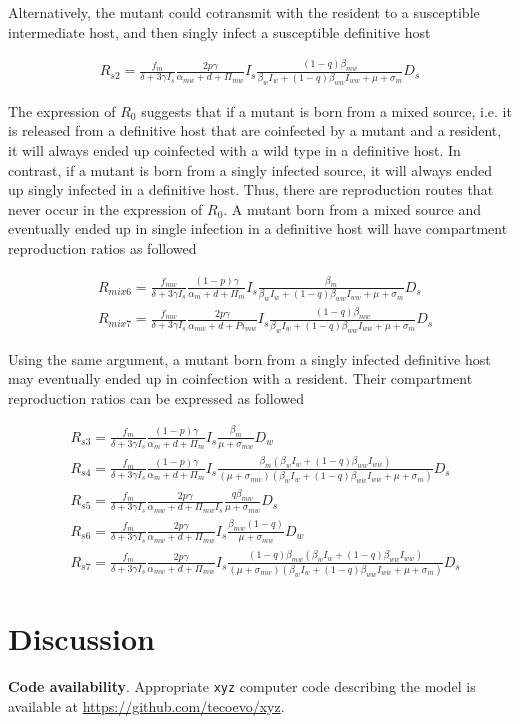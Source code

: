 \documentclass{article}
\begin{document}
Alternatively, the mutant could cotransmit with the resident to a susceptible intermediate host, and then singly infect a susceptible definitive host

\begin{align}
R_{s2} = \frac{f_m}{\delta +3 \gamma  I_s} \frac{2 p \gamma }{\alpha_{mw} + d + \Pi_{mw}} I_s \frac{ (1-q)\beta_{mw}}{\beta_w I_w +  (1- q) \beta_{ww} I_{ww} +\mu +\sigma_m} D_s
\end{align}

The expression of $R_0$ suggests that if a mutant is born from a mixed source, i.e. it is released from a definitive host that are coinfected by a mutant and a resident, it will always ended up coinfected with a wild type in a definitive host. In contrast, if a mutant is born from a singly infected source, it will always ended up singly infected in a definitive host. Thus, there are reproduction routes that never occur in the expression of $R_0$. A mutant born from a mixed source and eventually ended up in single infection in a definitive host will have compartment reproduction ratios as followed

\begin{align}
& R_{mix6} = \frac{f_{mw}}{\delta + 3 \gamma I_s} \frac{(1-p) \gamma}{\alpha_m + d + \Pi_m} I_s \frac{\beta_m}{\beta_w I_w + (1-q) \beta_{ww} I_{ww} + \mu + \sigma_m} D_s \\
& R_{mix7} = \frac{f_{mw}}{\delta + 3 \gamma I_s} \frac{2 p \gamma}{\alpha_{mw} + d + Pi_{mw}} I_s \frac{(1-q)\beta_{mw}}{\beta_w I_w + (1-q) \beta_{ww} I_{ww} + \mu + \sigma_m} D_s
\end{align}

Using the same argument, a mutant born from a singly infected definitive host may eventually ended up in coinfection with a resident. Their compartment reproduction ratios can be expressed as followed

\begin{align}
& R_{s3} = \frac{f_m}{\delta + 3 \gamma I_s}  \frac{(1-p) \gamma}{\alpha_m + d + \Pi_m} I_s \frac{\beta_m }{\mu +\sigma_{mw}} D_w \\
& R_{s4} = \frac{f_{m}}{\delta +3 \gamma  I_s} \frac{(1-p) \gamma}{\alpha_m + d + \Pi_m} I_s \frac{\beta_m (\beta_w I_w + (1-q) \beta_{ww} I_{ww})}{(\mu + \sigma_{mw}) (\beta_w I_w +  (1- q)\beta_{ww} I_{ww} + \mu + \sigma_m)} D_s \\
& R_{s5} = \frac{f_{m}}{\delta + 3 \gamma  I_s} \frac{2 p \gamma}{\alpha_{mw} + d + \Pi_{mw} I_s} \frac{q \beta_{mw}}{\mu + \sigma_{mw}} D_s \\
& R_{s6} = \frac{f_{m}}{\delta +3 \gamma  I_s} \frac{2 p \gamma}{\alpha_{mw} + d + \Pi_{mw}} I_s \frac{\beta_{mw} (1-q)}{\mu + \sigma_{mw}} D_w \\
& R_{s7} = \frac{f_{m}}{\delta + 3 \gamma  I_s} \frac{2 p \gamma }{\alpha_{mw} + d + \Pi_{mw}} I_s \frac{(1-q) \beta_{mw}  (\beta_w I_w +(1-q) \beta_{ww} I_{ww} )}{(\mu +\sigma_{mw}) (\beta_w I_w +  (1-q)\beta_{ww} I_{ww} +\mu + \sigma_m)} D_s
\end{align}
\section{Discussion}

\textbf{Code availability}.
Appropriate {\tt{xyz}} computer code describing the model is available at {\url{https://github.com/tecoevo/xyz}}.







\appendix
\end{document}
